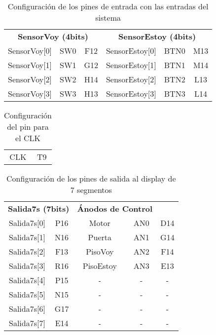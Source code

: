 	\begin{table}[H]
    \centering
		\begin{tabular}{|c|c|c||c|c|c|}
			\hline
			\rowcolor[rgb]{0.21,0.69,0.87}\multicolumn{6}{|c|}{  \textbf{ {Configuración Pines de entrada}}} \\
			\hline \hline
			\multicolumn{3}{|c|}{  \textbf{ {SensorVoy (4bits)}}} & \multicolumn{3}{|c|}{\textbf{SensorEstoy (4bits)}} \\
			\hline
			SensorVoy[0] & SW0 & F12 & SensorEstoy[0] & BTN0 & M13 \\
			\hline
			SensorVoy[1] & SW1 & G12 & SensorEstoy[1] & BTN1 & M14 \\
			\hline
			SensorVoy[2] & SW2 & H14 & SensorEstoy[2] & BTN2 & L13 \\
			\hline
			SensorVoy[3] & SW3 & H13 & SensorEstoy[3] & BTN3 & L14 \\
			\hline
		\end{tabular}
		\caption{ Configuración de los pines de entrada con las entradas del sistema }
		\label{tab:pinEntradas}
	\end{table}

	\begin{table}[H]
    \centering
		\begin{tabular}{|c|c|}
			\hline
			\rowcolor[rgb]{0.21,0.69,0.87}\multicolumn{2}{|c|}{  \textbf{ {Configuración pin CLK}}} \\
			\hline \hline
			CLK & T9 \\ 
			\hline
		\end{tabular}
		\caption{ Configuración del pin para el CLK }
		\label{tab:pinCLK}
	\end{table}

	\begin{table}[H]
    \centering
		\begin{tabular}{|c|c||c|c|c|}
			\hline
			\rowcolor[rgb]{0.21,0.69,0.87}\multicolumn{5}{|c|}{  \textbf{ {Configuración Pines de los displays de 7 segmentos}}} \\
			\hline \hline
			\multicolumn{2}{|c|}{  \textbf{ { Salida7s (7bits)}}} & \multicolumn{2}{|c|}{\textbf{Ánodos de Control}} \\
			\hline
			Salida7s[0] & P16 & Motor & AN0 & D14 \\
			\hline
			Salida7s[1] & N16 & Puerta & AN1 & G14 \\
			\hline
			Salida7s[2] & F13 & PisoVoy & AN2 & F14 \\
			\hline
			Salida7s[3] & R16 & PisoEstoy & AN3 & E13 \\
			\hline
			Salida7s[4] & P15 & - & - & - \\
			\hline
			Salida7s[5] & N15 & - & - & - \\
			\hline
			Salida7s[6] & G17 & - & - & - \\
			\hline
			Salida7s[7] & E14 & - & - & - \\
			\hline
		\end{tabular}
		\caption{ Configuración de los pines de salida al display de 7 segmentos }
		\label{tab:pin7s}
	\end{table}


